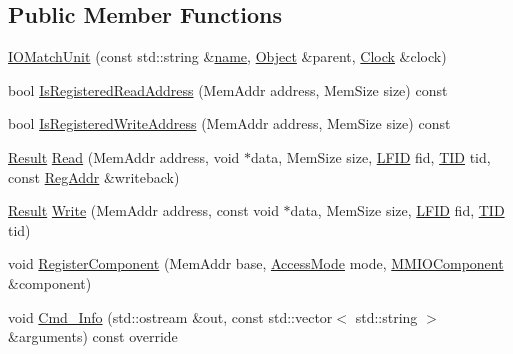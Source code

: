 \subsection*{Public Member Functions}
\begin{DoxyCompactItemize}
\item 
\hyperlink{class_simulator_1_1drisc_1_1_i_o_match_unit_ae366a3316a2081406476d6adda0b8e41}{I\+O\+Match\+Unit} (const std\+::string \&\hyperlink{mtconf_8c_a8f8f80d37794cde9472343e4487ba3eb}{name}, \hyperlink{class_simulator_1_1_object}{Object} \&parent, \hyperlink{class_simulator_1_1_clock}{Clock} \&clock)
\item 
bool \hyperlink{class_simulator_1_1drisc_1_1_i_o_match_unit_a2dcec12c65ea6e0d88e558e46559d30e}{Is\+Registered\+Read\+Address} (Mem\+Addr address, Mem\+Size size) const 
\item 
bool \hyperlink{class_simulator_1_1drisc_1_1_i_o_match_unit_a59183bf7e2285c8bb55832bc4ff3a9cd}{Is\+Registered\+Write\+Address} (Mem\+Addr address, Mem\+Size size) const 
\item 
\hyperlink{namespace_simulator_a4b6b5616e7236c0c131516a441776805}{Result} \hyperlink{class_simulator_1_1drisc_1_1_i_o_match_unit_a894606ca56355078146c24cd83d8e72d}{Read} (Mem\+Addr address, void $\ast$data, Mem\+Size size, \hyperlink{namespace_simulator_aaccbc706b2d6c99085f52f6dfc2333e4}{L\+F\+I\+D} fid, \hyperlink{namespace_simulator_a483cc4ecee1736e895054617672cded5}{T\+I\+D} tid, const \hyperlink{struct_simulator_1_1_reg_addr}{Reg\+Addr} \&writeback)
\item 
\hyperlink{namespace_simulator_a4b6b5616e7236c0c131516a441776805}{Result} \hyperlink{class_simulator_1_1drisc_1_1_i_o_match_unit_a8aaee17de76f6375af71b07eee25279c}{Write} (Mem\+Addr address, const void $\ast$data, Mem\+Size size, \hyperlink{namespace_simulator_aaccbc706b2d6c99085f52f6dfc2333e4}{L\+F\+I\+D} fid, \hyperlink{namespace_simulator_a483cc4ecee1736e895054617672cded5}{T\+I\+D} tid)
\item 
void \hyperlink{class_simulator_1_1drisc_1_1_i_o_match_unit_a8352c1af79d47b33a398a5724ca05112}{Register\+Component} (Mem\+Addr base, \hyperlink{class_simulator_1_1drisc_1_1_i_o_match_unit_ab8216ac84dabbc1133fe4d26298de231}{Access\+Mode} mode, \hyperlink{class_simulator_1_1drisc_1_1_m_m_i_o_component}{M\+M\+I\+O\+Component} \&component)
\item 
void \hyperlink{class_simulator_1_1drisc_1_1_i_o_match_unit_a542060cb44834f30736ea2a733805ba2}{Cmd\+\_\+\+Info} (std\+::ostream \&out, const std\+::vector$<$ std\+::string $>$ \&arguments) const override
\end{DoxyCompactItemize}
